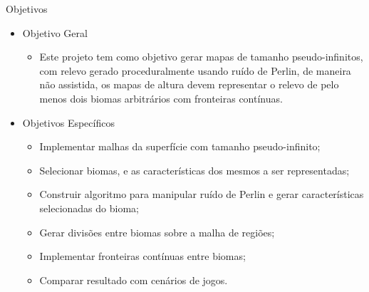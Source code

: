 \begin{frame}{Objetivos}
    \begin{itemize}
        \item Objetivo Geral
        \begin{itemize}
            \item Este projeto tem como objetivo gerar mapas de tamanho pseudo-infinitos, com 
            relevo gerado proceduralmente usando ruído 
            de Perlin, de maneira não assistida, os mapas de altura devem representar o 
            relevo de pelo menos dois biomas arbitrários com fronteiras contínuas.
        \end{itemize}
        \item Objetivos Específicos
        \begin{itemize}
            \item Implementar malhas da superfície com tamanho pseudo-infinito;
            \item Selecionar biomas, e as características dos mesmos a ser representadas;
            \item Construir algoritmo para manipular ruído de Perlin e gerar características
                selecionadas do bioma;
            \item Gerar divisões entre biomas sobre a malha de regiões;
            \item Implementar fronteiras contínuas entre biomas;
            \item Comparar resultado com cenários de jogos.
        \end{itemize}
    \end{itemize}
\end{frame}
